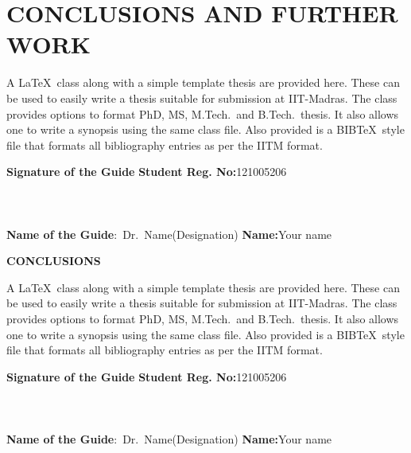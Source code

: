 	\chapter{CONCLUSIONS AND FURTHER WORK}
	\label{chap:conclusion}
	
		\noindent A \LaTeX\ class along with a simple template thesis are provided here.  These can be used to easily write a thesis suitable for submission at IIT-Madras.  The class provides options to format PhD, MS, M.Tech.\ and B.Tech.\ thesis.  It also allows one to write a synopsis using the same class file.  Also provided is a BIB\TeX\ style file that formats all bibliography entries as per the IITM format.
	
	
	
	\vspace*{24pt}
	
	\noindent \textbf{Signature of the Guide} \hspace*{70mm} \textbf{Student Reg. No:}121005206\\
		\\
	\\
	\\
\noindent \textbf{Name of the Guide}:~Dr.~Name(Designation) \hspace*{35mm} \textbf{Name:}Your name
\pagebreak
	\pagebreak
	

	\begin{center}
		\Large{{\textbf{CONCLUSIONS}}}
	\end{center}
	
		\noindent A \LaTeX\ class along with a simple template thesis are provided here.  These can be used to easily write a thesis suitable for submission at IIT-Madras.  The class provides options to format PhD, MS, M.Tech.\ and B.Tech.\ thesis.  It also allows one to write a synopsis using the same class file.  Also provided is a BIB\TeX\ style file that formats all bibliography entries as per the IITM format.
	
	\vspace*{24pt}
	
	\noindent \textbf{Signature of the Guide} \hspace*{70mm} \textbf{Student Reg. No:}121005206\\
		\\
	\\
	\\
\noindent \textbf{Name of the Guide}:~Dr.~Name(Designation) \hspace*{35mm} \textbf{Name:}Your name
\pagebreak
	\pagebreak
	

